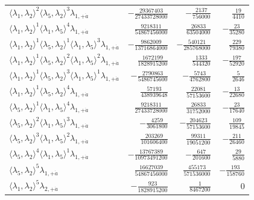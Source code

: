 \begin{longtable}{@{}lrrr@{}}
$\langle\lambda_1,\lambda_2\rangle^{2}\langle\lambda_5,\lambda_2\rangle^{3}\lambda_{1,+\dot a}$ & $-\frac{29367403}{27433728000}$ & $-\frac{2137}{756000}$ & $\frac{19}{4410}$ \\
$\langle\lambda_1,\lambda_2\rangle^{1}\langle\lambda_1,\lambda_5\rangle^{4}\lambda_{1,+\dot a}$ & $\frac{9218311}{54867456000}$ & $\frac{26833}{63504000}$ & $-\frac{23}{35280}$ \\
$\langle\lambda_1,\lambda_2\rangle^{1}\langle\lambda_5,\lambda_2\rangle^{1}\langle\lambda_1,\lambda_5\rangle^{3}\lambda_{1,+\dot a}$ & $-\frac{9862009}{13716864000}$ & $-\frac{540121}{285768000}$ & $\frac{229}{79380}$ \\
$\langle\lambda_1,\lambda_2\rangle^{1}\langle\lambda_5,\lambda_2\rangle^{2}\langle\lambda_1,\lambda_5\rangle^{2}\lambda_{1,+\dot a}$ & $\frac{1672199}{1828915200}$ & $\frac{1333}{544320}$ & $-\frac{197}{52920}$ \\
$\langle\lambda_1,\lambda_2\rangle^{1}\langle\lambda_5,\lambda_2\rangle^{3}\langle\lambda_1,\lambda_5\rangle^{1}\lambda_{1,+\dot a}$ & $-\frac{2790863}{5486745600}$ & $-\frac{5743}{4762800}$ & $\frac{5}{2646}$ \\
$\langle\lambda_1,\lambda_2\rangle^{1}\langle\lambda_5,\lambda_2\rangle^{4}\lambda_{1,+\dot a}$ & $\frac{57193}{438939648}$ & $\frac{22081}{57153600}$ & $-\frac{13}{22680}$ \\
$\langle\lambda_5,\lambda_2\rangle^{1}\langle\lambda_1,\lambda_5\rangle^{4}\lambda_{1,+\dot a}$ & $\frac{9218311}{27433728000}$ & $\frac{26833}{31752000}$ & $-\frac{23}{17640}$ \\
$\langle\lambda_5,\lambda_2\rangle^{2}\langle\lambda_1,\lambda_5\rangle^{3}\lambda_{1,+\dot a}$ & $-\frac{4259}{3061800}$ & $-\frac{204623}{57153600}$ & $\frac{109}{19845}$ \\
$\langle\lambda_5,\lambda_2\rangle^{3}\langle\lambda_1,\lambda_5\rangle^{2}\lambda_{1,+\dot a}$ & $\frac{203269}{101606400}$ & $\frac{99311}{19051200}$ & $-\frac{211}{26460}$ \\
$\langle\lambda_5,\lambda_2\rangle^{4}\langle\lambda_1,\lambda_5\rangle^{1}\lambda_{1,+\dot a}$ & $-\frac{13767389}{10973491200}$ & $-\frac{647}{201600}$ & $\frac{29}{5880}$ \\
$\langle\lambda_5,\lambda_2\rangle^{5}\lambda_{1,+\dot a}$ & $\frac{16627039}{54867456000}$ & $\frac{455173}{571536000}$ & $-\frac{193}{158760}$ \\
$\langle\lambda_1,\lambda_2\rangle^{5}\lambda_{2,+\dot a}$ & $-\frac{923}{1828915200}$ & $\frac{1}{8467200}$ & $0$ \\

\end{longtable}
